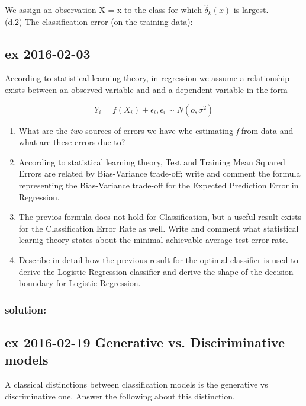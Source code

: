 \documentclass[a4paper,12pt,titlepage]{article} %
\begin{document}
We assign an observation X = x to the class for which $ \hat{\delta}_{k}(x) $ is largest.\\

(d.2) The classification error (on the training data): 



\newpage

\subsection{ex 2016-02-03}
According to statistical learning theory, in regression we assume a relationship exists between an observed variable and and a dependent variable in the form 

$$ Y_{i} = f(X_{i}) + \epsilon_{i}, \epsilon_{i} \sim N(o, \sigma^{2})$$

\begin{enumerate}
\item What are the \textit{two} sources of errors we have whe estimating \textit{f} from data and what are these errors due to?
\item According to statistical learning theory, Test and Training Mean Squared Errors are related by Bias-Variance trade-off; write and comment the formula representing the Bias-Variance trade-off for the Expected Prediction Error in Regression.
\item The previos formula does not hold for Classification, but a useful result exists for the Classification Error Rate as well. Write and comment what statistical learnig theory states about the minimal achievable average test error rate.
\item Describe in detail how the previous result for the optimal classifier is used to derive the Logistic Regression classifier and derive the shape of the decision boundary for Logistic Regression.
\end{enumerate}

\subsubsection{solution:}


\newpage
\subsection{ex 2016-02-19 Generative vs. Disciriminative models}
A classical distinctions between classification models is the generative vs discriminative one. Answer the following about this distinction.
\end{document}
